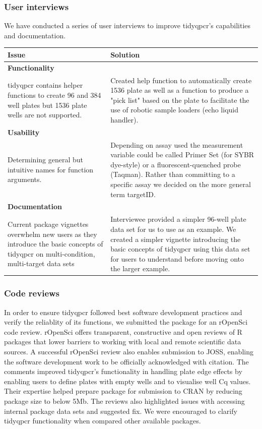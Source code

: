\documentclass{SBCbookchapter}
\begin{document}
\subsubsection{User interviews}
We have conducted a series of user interviews to improve tidyqpcr's capabilities and documentation.

\begin{center}
\begin{tabular}{|| m{5.5cm} | m{8cm} ||} 
 \hline
 \textbf{\large Issue} & \textbf{\large Solution} \\ [0.5ex] 
 \hline\hline
 \multicolumn{2}{|l|}{\textbf{Functionality}} \\
 \hline
 tidyqpcr contains helper functions to create 96 and 384 well plates but 1536 plate wells are not supported. & Created help function to automatically create 1536 plate as well as a function to produce a "pick list" based on the plate to facilitate the use of robotic sample loaders (echo liquid handler). \\ 
 \hline
 \multicolumn{2}{|l|}{\textbf{Usability}} \\
 \hline
 Determining general but intuitive names for function arguments. & Depending on assay used the measurement variable could be called Primer Set (for SYBR dye-style) or a fluorescent-quenched probe (Taqman). Rather than committing to a specific assay we decided on the more general term targetID. \\
 \hline
 \multicolumn{2}{|l|}{\textbf{Documentation}} \\
 \hline
 Current package vignettes overwhelm new users as they introduce the basic concepts of tidyqpcr on multi-condition, multi-target data sets & Interviewee provided a simpler 96-well plate data set for us to use as an example. We created a simpler vignette introducing the basic concepts of tidyqpcr using this data set for users to understand before moving onto the larger example. \\
 \hline
\end{tabular}
\end{center}

\subsubsection{Code reviews}
In order to ensure tidyqpcr followed best software development practices and verify the reliablity of its functions, we submitted the package for an rOpenSci code review. 
rOpenSci offers transparent, constructive and open reviews of R packages that lower barriers to working with local and remote scientific data sources.
A successful rOpenSci review also enables submission to JOSS, enabling the software development work to be officially acknowledged with citation.
The comments improved tidyqpcr's functionality in handling plate edge effects by enabling users to define plates with empty wells and to visualise well Cq values.
Their expertise helped prepare package for submission to CRAN by reducing package size to below 5Mb.
The reviews also highlighted issues with accessing internal package data sets and suggested fix.
We were encouraged to clarify tidyqpcr functionality when compared other available packages.
\end{document}
